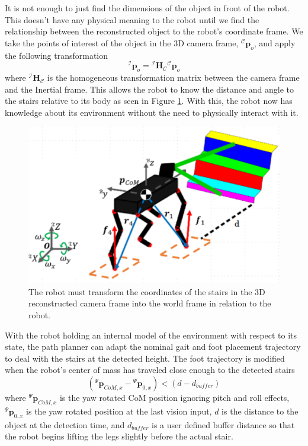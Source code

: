 It is not enough to just find the dimensions of the object in front of the robot. This doesn't have any physical meaning to the robot until we find the relationship between the reconstructed object to the robot's coordinate frame. We take the points of interest of the object in the 3D camera frame, ${}^\mathcal{C}\bm{p}_o$, and apply the following transformation
\begin{equation}
{}^\mathcal{I}\bm{p}_o = {}^\mathcal{I}\bm{H}_\mathcal{C}{}^\mathcal{C}\bm{p}_o
\end{equation}
where ${}^\mathcal{I}\bm{H}_\mathcal{C}$ is the homogeneous transformation matrix between the camera frame and the Inertial frame. This allows the robot to know the distance and angle to the stairs relative to its body as seen in Figure \ref{fig:RSR}. With this, the robot now has knowledge about its environment without the need to physically interact with it. 
\begin{figure}[!h]
\centering
\includegraphics[width=\columnwidth]{Figures/RobotStairsRelation.pdf}
\caption{The robot must transform the coordinates of the stairs in the 3D reconstructed camera frame into the world frame in relation to the robot.}
\label{fig:RSR}
\end{figure}
With the robot holding an internal model of the environment with respect to its state, the path planner can adapt the nominal gait and foot placement trajectory to deal with the stairs at the detected height. The foot trajectory is modified when the robot's center of mass has traveled close enough to the detected stairs
\begin{equation}
({}^\Psi\bm{p}_{CoM,x} - {}^\Psi\bm{p}_{0,x}) < (d - d_{buffer})
\end{equation}
where ${}^\Psi\bm{p}_{CoM,x}$ is the yaw rotated CoM position ignoring pitch and roll effects, ${}^\Psi\bm{p}_{0,x}$ is the yaw rotated position at the last vision input, $d$ is the distance to the object at the detection time, and $d_{buffer}$ is a user defined buffer distance so that the robot begins lifting the legs slightly before the actual stair.


